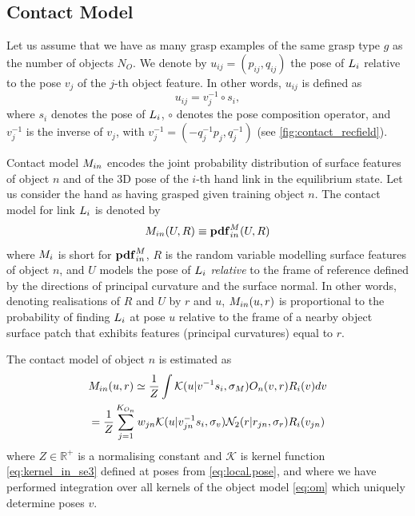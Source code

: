 \subsection{Contact Model}\label{sec:contact.model}

Let us assume that we have as many grasp examples of the same grasp type $g$ as the number of objects $N_O$. We denote by $u_{ij} = (p_{ij}, q_{ij})$ the pose of $L_i$ relative to the pose $v_j$ of the $j$-th object feature. In other words, $u_{ij}$ is defined as
\begin{equation}
u_{ij} = v_j^{-1} \circ s_i,
\label{eq:local.pose}
\end{equation}
where $s_i$ denotes the pose of $L_i$, $\circ$ denotes the pose composition operator, and $v_j^{-1}$ is the inverse of $v_j$, with $v_j^{-1} = (-q_j^{-1}p_j, q_j^{-1})$ (see \fig\ref{fig:contact_recfield}). 

Contact model $M_{in}$ encodes the joint probability distribution of surface features of object $n$ and of the 3D pose of the $i$-th hand link in the equilibrium state. Let us consider the hand as having grasped given training object $n$. The contact model for link $L_i$ is denoted by
\begin{equation}\label{eq:M}
M_{in}(U, R) \equiv \mathbf{pdf}^M_{in}(U, R)
\end{equation}
where $M_i$ is short for $\mathbf{pdf}^M_{in}$, $R$ is the random variable modelling surface features of object $n$, and $U$ models the pose of $L_i$ \emph{relative} to the frame of reference defined by the directions of principal curvature and the surface normal. In other words, denoting realisations of $R$ and $U$ by $r$ and $u$, $M_{in}(u, r)$ is proportional to the probability of finding $L_i$ at pose $u$ relative to the frame of a nearby object surface patch that exhibits features (principal curvatures) equal to $r$.

The contact model of object $n$ is estimated as
\begin{equation}\label{eq:cm_n}
\begin{split}
&M_{in}(u, r) \simeq \frac 1Z \int \mathcal{K}(u|v^{-1}s_i, \sigma_M) O_{n}(v, r) R_{i}(v) dv\\
&= \frac 1Z \sum_{j=1}^{K_{O_n}} w_{jn} \mathcal{K}(u|v_{jn}^{-1}s_i, \sigma_v) \mathcal{N}_2({r}| r_{jn}, \sigma_r) R_{i}(v_{jn})
\end{split}
\end{equation}
where $Z \in \mathbb R^+$ is a normalising constant and $\mathcal{K}$ is kernel function \eqref{eq:kernel_in_se3} defined at poses from \eq\eqref{eq:local.pose}, and where we have performed integration over all kernels of the object model \eqref{eq:om} which uniquely determine poses $v$.

